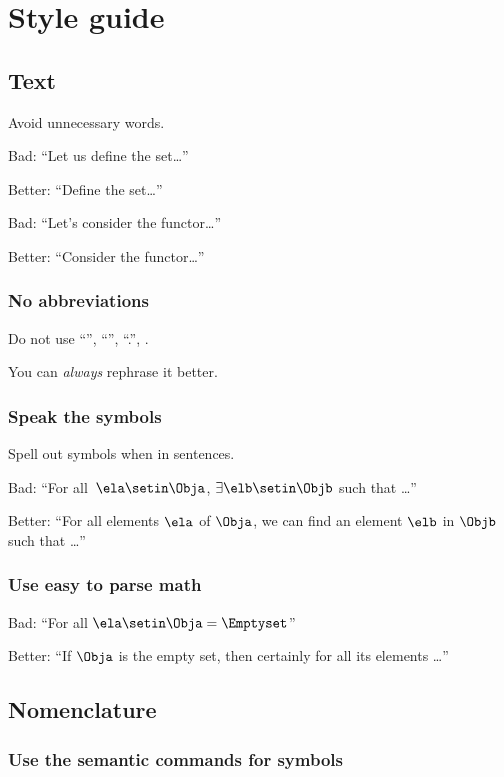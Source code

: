 
\section{Style guide}
\subsection*{Text}

Avoid unnecessary words.

Bad: ``Let us define the set\dots''

Better: ``Define the set\dots''

Bad: ``Let's consider the functor\dots''

Better: ``Consider the functor\dots ''

\subsubsection*{No abbreviations}
Do not use ``\ie'', ``\eg'', ``\etc.'', \etc.

You can \emph{always} rephrase it better.

\subsubsection*{Speak the symbols}
Spell out symbols when in sentences.

Bad: ``For all~$\ela \setin \Obja$, $\exists \elb \setin \Objb$ such that \dots''

Better: ``For all elements $\ela$ of $\Obja$, we can find an element $\elb$ in $\Objb$ such that \dots''

\subsubsection*{Use easy to parse math}

Bad: ``For all $\ela\setin \Obja=\Emptyset$''

Better: ``If $\Obja$ is the empty set, then certainly for all its elements \dots''

\subsection*{Nomenclature}

\subsubsection*{Use the semantic commands for symbols}

